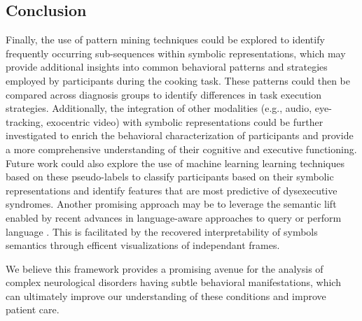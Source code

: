 \begin{chapterabstract}




\section{Conclusion}



    Finally, the use of pattern mining techniques could be explored to identify frequently occurring sub-sequences within symbolic representations, which may provide additional insights into common behavioral patterns and strategies employed by participants during the cooking task. These patterns could then be compared across diagnosis groups to identify differences in task execution strategies. Additionally, the integration of other modalities (e.g., audio, eye-tracking, exocentric video) with symbolic representations could be further investigated to enrich the behavioral characterization of participants and provide a more comprehensive understanding of their cognitive and executive functioning. Future work could also explore the use of machine learning learning techniques based on these pseudo-labels to classify participants based on their symbolic representations and identify features that are most predictive of dysexecutive syndromes. Another promising approach may be to leverage the semantic lift enabled by recent advances in language-aware approaches to query or perform language . This is facilitated by the recovered interpretability of symbols semantics through efficent visualizations of independant frames. 

    We believe this framework provides a promising avenue for the analysis of complex neurological disorders having subtle behavioral manifestations, which can ultimately improve our understanding of these conditions and improve patient care.




\end{chapterabstract}
